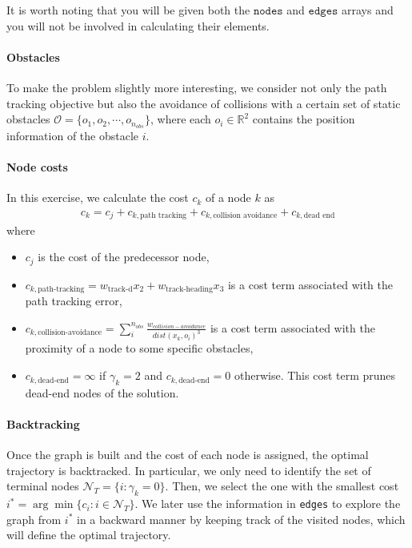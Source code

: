		It is worth noting that you will be given both the $\texttt{nodes}$ and $\texttt{edges}$ arrays and you will not be involved in calculating their elements. 
	\paragraph{Obstacles}
		To make the problem slightly more interesting, we consider not only the path tracking objective but also the avoidance of collisions with a certain set of static obstacles $\mathcal{O} = \lbrace o_1, o_2, \cdots, o_{n_{obs}}\rbrace$, where each $o_i\in\mathbb{R}^2$ contains the position information of the obstacle $i$.
	\paragraph{Node costs}
		In this exercise, we calculate the cost $c_k$ of a node $k$ as
		\begin{align}
			c_k = c_j + c_{k,\text{path tracking}} + c_{k,\text{collision avoidance}} + c_{k,\text{dead end}}
		\end{align}
		where 
		\begin{itemize}
			\item $c_j$ is the cost of the predecessor node, 
			\item $c_{k,\text{path-tracking}} = w_{\text{track-d}}x_2 + w_{\text{track-heading}}x_3$ is a cost term associated with the path tracking error,
			\item $c_{k,\text{collision-avoidance}} = \sum_i^{n_{obs}} \frac{w_{collision-avoidance}}{dist(x_k, o_i)^3}$ is a cost term associated with the proximity of a node to some specific obstacles, 
			\item $c_{k,\text{dead-end}} = \infty$ if $\gamma_k = 2$ and $c_{k,\text{dead-end}} = 0$ otherwise. This cost term prunes dead-end nodes of the solution.
		\end{itemize}
	\paragraph{Backtracking}	
		Once the graph is built and the cost of each node is assigned, the optimal trajectory is backtracked. 
		In particular, we only need to identify the set of terminal nodes $\mathcal{N}_T = \lbrace i : \gamma_k = 0\rbrace$. Then, we select the one with the smallest cost $i^* = \arg\min\lbrace c_i : i\in\mathcal{N}_T\rbrace$. We later use the information in \texttt{edges} to explore the graph from $i^*$ in a backward manner by keeping track of the visited nodes, which will define the optimal trajectory. 
